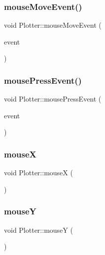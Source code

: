 \mbox{\label{class_plotter_aedd6ee525b4cacb6bcbc7540ed1ef3e9}} 
\subsubsection{\texorpdfstring{mouse\+Move\+Event()}{mouseMoveEvent()}}
{\footnotesize\ttfamily void Plotter\+::mouse\+Move\+Event (\begin{DoxyParamCaption}\item[{Q\+Mouse\+Event $\ast$}]{event }\end{DoxyParamCaption})}

\mbox{\label{class_plotter_aac8dfc9c49d06ccf085973ceec6eb50c}} 
\subsubsection{\texorpdfstring{mouse\+Press\+Event()}{mousePressEvent()}}
{\footnotesize\ttfamily void Plotter\+::mouse\+Press\+Event (\begin{DoxyParamCaption}\item[{Q\+Mouse\+Event $\ast$}]{event }\end{DoxyParamCaption})}

\mbox{\label{class_plotter_acc318f23eb9f135d13431c05221e1ee9}} 
\subsubsection{\texorpdfstring{mouseX}{mouseX}}
{\footnotesize\ttfamily void Plotter\+::mouseX (\begin{DoxyParamCaption}\item[{int}]{ }\end{DoxyParamCaption})\hspace{0.3cm}{\ttfamily [signal]}}

\mbox{\label{class_plotter_ae66c4db3fec253319af537aa627d8f1b}} 
\subsubsection{\texorpdfstring{mouseY}{mouseY}}
{\footnotesize\ttfamily void Plotter\+::mouseY (\begin{DoxyParamCaption}\item[{int}]{ }\end{DoxyParamCaption})\hspace{0.3cm}{\ttfamily [signal]}}

